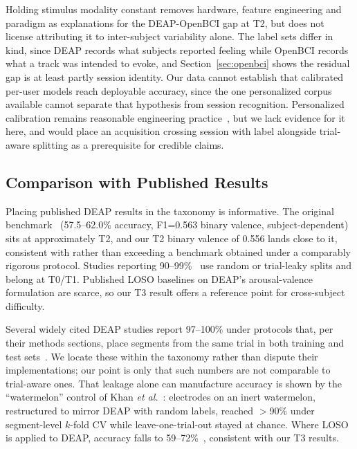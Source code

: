 \documentclass[conference,a4paper]{IEEEtran}
\begin{document}
Holding stimulus modality constant removes hardware, feature engineering and paradigm as explanations for the DEAP-OpenBCI gap at T2, but does not license attributing it to inter-subject variability alone. The label sets differ in kind, since DEAP records what subjects reported feeling while OpenBCI records what a track was intended to evoke, and Section~\ref{sec:openbci} shows the residual gap is at least partly session identity. Our data cannot establish that calibrated per-user models reach deployable accuracy, since the one personalized corpus available cannot separate that hypothesis from session recognition. Personalized calibration remains reasonable engineering practice~\cite{lotte2018}, but we lack evidence for it here, and would place an acquisition crossing session with label alongside trial-aware splitting as a prerequisite for credible claims.

\subsection{Comparison with Published Results}

Placing published DEAP results in the taxonomy is informative. The original benchmark~\cite{koelstra2012} (57.5--62.0\% accuracy, F1=0.563 binary valence, subject-dependent) sits at approximately T2, and our T2 binary valence of 0.556 lands close to it, consistent with rather than exceeding a benchmark obtained under a comparably rigorous protocol. Studies reporting 90--99\%~\cite{qian2024} use random or trial-leaky splits and belong at T0/T1. Published LOSO baselines on DEAP's arousal-valence formulation are scarce, so our T3 result offers a reference point for cross-subject difficulty.

Several widely cited DEAP studies report 97--100\% under protocols that, per their methods sections, place segments from the same trial in both training and test sets~\cite{algarni2022, chen2019accurate, pichandi2024, jin2020}. We locate these within the taxonomy rather than dispute their implementations; our point is only that such numbers are not comparable to trial-aware ones. That leakage alone can manufacture accuracy is shown by the ``watermelon'' control of Khan \textit{et al.}~\cite{khan2025}: electrodes on an inert watermelon, restructured to mirror DEAP with random labels, reached $>$90\% under segment-level $k$-fold CV while leave-one-trial-out stayed at chance. Where LOSO is applied to DEAP, accuracy falls to 59--72\%~\cite{yang2019}, consistent with our T3 results.
\end{document}
